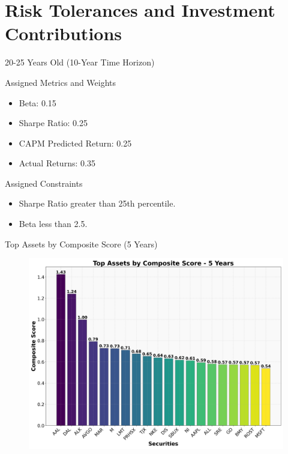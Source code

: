 \documentclass{beamer}
\begin{document}
\section{Risk Tolerances and Investment Contributions}
\begin{frame}{20-25 Years Old (10-Year Time Horizon)}
    \begin{block}{Assigned Metrics and Weights}
        \begin{itemize}
            \item Beta: 0.15
            \item Sharpe Ratio: 0.25
            \item CAPM Predicted Return: 0.25
            \item Actual Returns: 0.35
        \end{itemize}
    \end{block}
    \begin{block}{Assigned Constraints}
        \begin{itemize}
            \item Sharpe Ratio greater than 25th percentile.
            \item Beta less than 2.5.
        \end{itemize}
    \end{block}
\end{frame}




\begin{frame}{Top Assets by Composite Score (5 Years)}
    \begin{figure}
        \centering
        \includegraphics[width=0.9\linewidth]{../Figures/top_assets_composite_score_5_years.png}
    \end{figure}
\end{frame}
\end{document}
